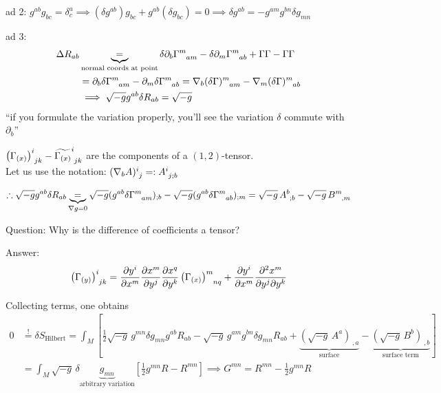 ad 2: $g^{ab}g_{bc} = \delta^a_c \implies (\delta g^{ab})g_{bc} + g^{ab}(\delta g_{bc}) = 0  \implies \delta g^{ab} = -g^{am} g^{bn} \delta g_{mn}$

ad 3: \begin{align*}
\Delta R_{ab} & \underbrace{=}_{\text{normal coords at point}} \delta \partial_b \ccf{m}{am} - \delta \partial_m \ccf{m}{ab} + \Gamma \Gamma - \Gamma \Gamma \\
& = \partial_b \delta \ccf{m}{am} - \partial_m \delta \ccf{m}{ab} = \nabla_b (\delta \Gamma)\indices{^{m}_{am}} - \nabla_m (\delta \Gamma)\indices{^{m}_{ab}} \\
& \implies \sqrt{-g} g^{ab} \delta R_{ab} = \sqrt{-g}
\end{align*}
``if you formulate the variation properly, you'll see the variation $\delta$ commute with $\partial _b$''

$\ccfx{i}{jk}{(x)} - \widetilde{\Gamma_{(x)}}\indices{^i_{jk}}$ are the components of a $(1,2)$-tensor. \\
Let us use the notation: $(\nabla_b A)\indices{^i_j} =: A\indices{^i_{j;b}}$

\[
\therefore \sqrt{-g} g^{ab} \delta R_{ab} \underbrace{=}_{ \nabla g = 0 } \sqrt{-g} (g^{ab} \delta \ccf{m}{am})_{;b} - \sqrt{-g} (g^{ab} \delta \ccf{m}{ab})_{ ; m} = \sqrt{-g} \, A\indices{^b_{;b}} - \sqrt{-g} \, B\indices{^m_{, m}}
\]

Question: Why is the difference of coefficients a tensor?

Answer:
\begin{align*}
\ccfx{i}{jk}{(y)} = \cibasis[y^i]{x^m} \cibasis[x^m]{y^j} \cibasis[x^q]{y^k} \ccfx{m}{nq}{(x)} + \cibasis[y^i]{x^m} \frac{ \partial^2 x^m}{ \partial y^j \partial y^k}
\end{align*}

Collecting terms, one obtains
\begin{align*}
  0 & \overset{!}{=} \delta S_{\text{Hilbert}} = \int_M [ \frac{1}{2} \sqrt{-g} \, g^{mn} \delta g_{mn} g^{ab} R_{ab} - \sqrt{-g} \, g^{am} g^{bn} \delta g_{mn} R_{ab} +    \underbrace{(\sqrt{-g} \, A^a)_{ \, , a} }_{\text{surface}} - \underbrace{(\sqrt{-g} \, B^b)_{ \, , b }}_{\text{surface term}}] \\
  & = \int_M \sqrt{-g} \, \delta \underbrace{g_{mn}}_{\text{arbitrary variation}} [\frac{1}{2} g^{mn} R - R^{mn}] \implies G^{mn} = R^{mn} - \frac{1}{2} g^{mn} R
\end{align*}

